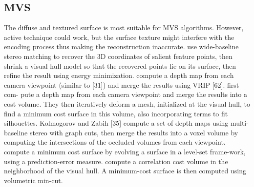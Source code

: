 
\subsection{MVS}
The diffuse and textured surface is most suitable for MVS algorithms. However, active technique could work, but the surface texture might interfere with the encoding process thus making the reconstruction inaccurate. \citeauthor{furukawa2008high} use wide-baseline stereo matching to recover the 3D coordinates of salient feature points, then shrink a visual hull model so that the recovered points lie on its surface, then refine the result using energy minimization. \citeauthor{goesele2006multi} compute a depth map from each camera viewpoint (similar to [31]) and merge the results using VRIP [62]. \citeauthor{esteban2004silhouette} first com- pute a depth map from each camera viewpoint and merge the results into a cost volume. They then iteratively deform a mesh, initialized at the visual hull, to find a minimum cost surface in this volume, also incorporating terms to fit silhouettes. Kolmogorov and Zabih [35] compute a set of depth maps using multi-baseline stereo with graph cuts, then merge the results into a voxel volume by computing the intersections of the occluded volumes from each viewpoint. \citeauthor{faugeras2002variational} compute a minimum cost surface by evolving a surface in a level-set frame-work, using a prediction-error measure. \citeauthor{vogiatzis2007multiview} compute a correlation cost volume in the neighborhood of the visual hull. A minimum-cost surface is then computed using volumetric min-cut.

